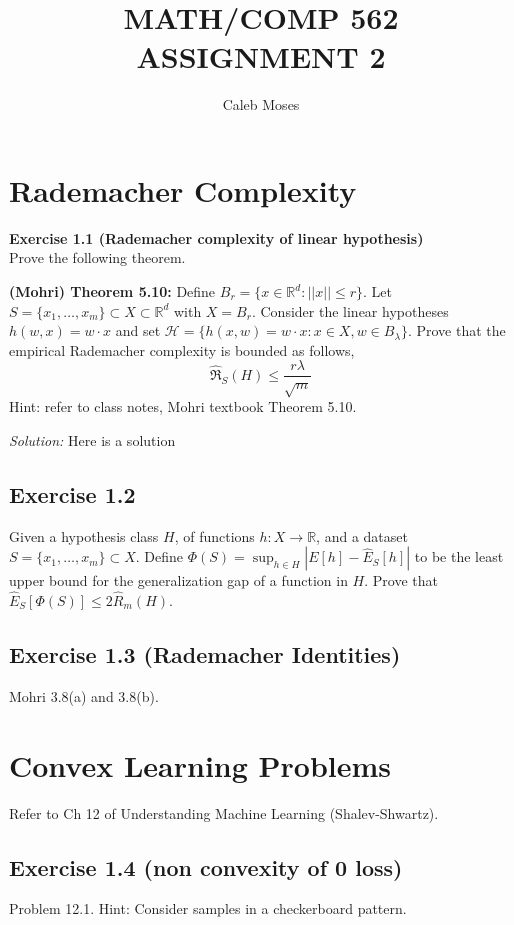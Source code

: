 \documentclass[
  10pt, %
  a4paper, %
  oneside, %
  headinclude,footinclude, %
  BCOR5mm, %
]{scrartcl}
\author{\spacedlowsmallcaps{Caleb Moses*}} %
\date{} %
\title{MATH/COMP 562 ASSIGNMENT 2}
\author{Caleb Moses}
\newenvironment{problem}[2][]
{ \begin{mdframed}[backgroundcolor=gray!20] \textbf{#1 #2} \\}
    {  \end{mdframed}}
\newenvironment{solution}
{\textit{Solution:}}
{}
\begin{document}
\maketitle

\section{Rademacher Complexity}

\begin{problem}{Exercise 1.1 (Rademacher complexity of linear hypothesis)}
Prove the following theorem.

\textbf{(Mohri) Theorem 5.10:} Define $B_r = \{x \in \mathbb{R}^d: ||x|| \leq r\}$. Let $S = \{x_1 , \ldots, x_m\} \subset X \subset \mathbb{R}^d$ with $X = B_r$. Consider the linear hypotheses $h(w, x) = w \cdot x$ and set $\mathcal{H} = \{h(x, w) = w \cdot x: x \in X, w \in B_\lambda\}$. Prove that the empirical Rademacher complexity is bounded as follows,
\[
  \hat{\mathfrak{R}}_S(H) \leq \frac{r\lambda}{\sqrt{m}}
\]
Hint: refer to class notes, Mohri textbook Theorem 5.10.
\end{problem}

\begin{solution}
	Here is a solution
\end{solution}

\subsection*{Exercise 1.2}
Given a hypothesis class $H$, of functions $h : X \rightarrow \mathbb{R}$, and a dataset $S = \{x_1 , \ldots, x_m\} \subset X$. Define $\Phi(S) = \sup_{h\in H} |E[h] - \hat{E}_S[h]|$ to be the least upper bound for the generalization gap of a function in $H$. Prove that $\hat{E}_S [\Phi(S)] \leq 2\hat{R}_m(H)$.

\subsection*{Exercise 1.3 (Rademacher Identities)}
Mohri 3.8(a) and 3.8(b).

\section{Convex Learning Problems}
Refer to Ch 12 of Understanding Machine Learning (Shalev-Shwartz).

\subsection*{Exercise 1.4 (non convexity of 0 loss)}
Problem 12.1. Hint: Consider samples in a checkerboard pattern.
\end{document}
